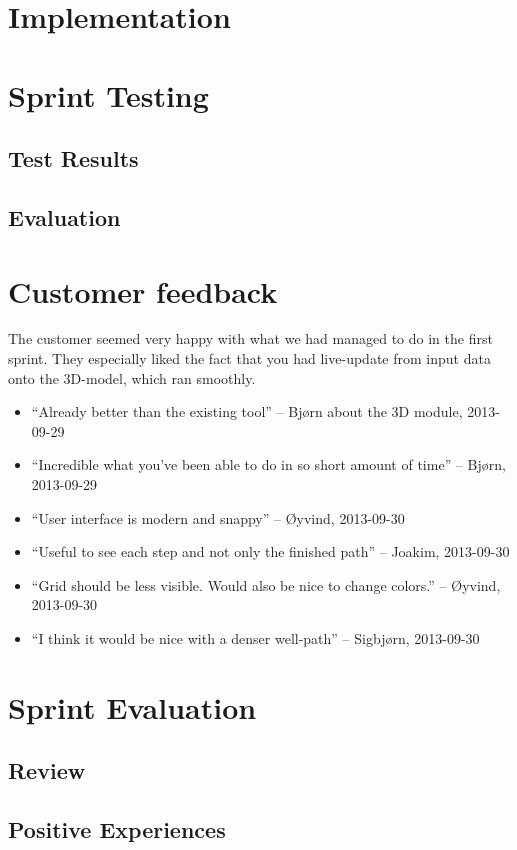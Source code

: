 \documentclass{report}
\begin{document}
\section{Implementation} \label{sec:implementation1}
\newpage
\section{Sprint Testing} \label{sec:sprint_testing1}
\subsection{Test Results} \label{subsec:test_results1}
\subsection{Evaluation} \label{subsec:evaluation1}
\newpage
\section{Customer feedback} \label{sec:cust_feed1}
The customer seemed very happy with what we had managed to do in the first sprint. They especially liked the fact that you had live-update from input data onto the 3D-model, which ran smoothly.
\begin{itemize}
\item “Already better than the existing tool” – Bjørn about the 3D module, 2013-09-29
\item “Incredible what you’ve been able to do in so short amount of time” – Bjørn, 2013-09-29
\item “User interface is modern and snappy” – Øyvind, 2013-09-30
\item “Useful to see each step and not only the finished path”  – Joakim, 2013-09-30
\item “Grid should be less visible. Would also be nice to change colors.” – Øyvind, 2013-09-30 
\item “I think it would be nice with a denser well-path” – Sigbjørn, 2013-09-30
\end{itemize}
\newpage
\section{Sprint Evaluation} \label{sec:sprint_eva1}
\subsection{Review} \label{subsec:review1}
\subsection{Positive Experiences} \label{subsec:pos_exp1}
\end{document}

